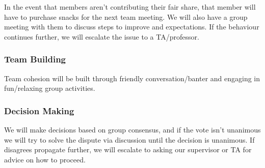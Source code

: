 \documentclass{article}
\begin{document}
In the event that members aren't contributing their fair share, that member will have
to purchase snacks for the next team meeting. We will also have a group meeting with 
them to discuss steps to improve and expectations. If the behaviour continues further, 
we will escalate the issue to a TA/professor.

\subsubsection*{Team Building}

Team cohesion will be built through friendly conversation/banter and engaging
in fun/relaxing group activities.

\subsubsection*{Decision Making} 

We will make decisions based on group consensus, and if the vote isn't unanimous we will try to solve the dispute
via discussion until the decision is unanimous. If disagrees propagate further, we will escalate to asking our supervisor
or TA for advice on how to proceed.
\end{document}
